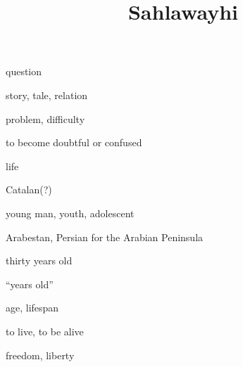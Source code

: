 \documentclass[avery5371,grid,frame]{flashcards}
\title{Sahlawayhi}
\begin{document}
\begin{flashcard}{\LARGE question}
\LARGE {}
\end{flashcard}
\begin{flashcard}{\LARGE story, tale, relation}
\LARGE {}
\end{flashcard}
\begin{flashcard}{\LARGE problem, difficulty}
\LARGE {}
\end{flashcard}
\begin{flashcard}{\LARGE to become doubtful or confused}
\LARGE {}
\end{flashcard}
\begin{flashcard}{\LARGE life}
\LARGE {}
\end{flashcard}
\begin{flashcard}{\LARGE Catalan(?)}
\LARGE {}
\end{flashcard}
\begin{flashcard}{\LARGE young man, youth, adolescent}
\LARGE {}
\end{flashcard}
\begin{flashcard}{\LARGE Arabestan, Persian for the Arabian Peninsula}
\LARGE {}
\end{flashcard}
\begin{flashcard}{\LARGE thirty years old}
\LARGE {}
\end{flashcard}
\begin{flashcard}{\LARGE ``years old''}
\LARGE {}
\end{flashcard}
\begin{flashcard}{\LARGE age, lifespan}
\LARGE {}
\end{flashcard}
\begin{flashcard}{\LARGE to live, to be alive}
\LARGE {}
\end{flashcard}
\begin{flashcard}{\LARGE freedom, liberty}
\LARGE {}
\end{flashcard}
\end{document}
